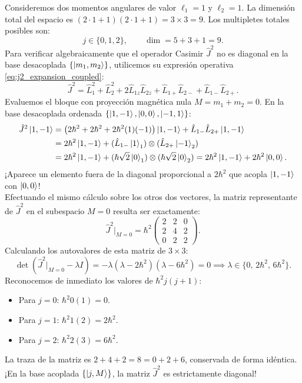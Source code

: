 Consideremos dos momentos angulares de valor $\ell_1 = 1$ y $\ell_2 = 1$. La dimensión total del espacio es $(2\cdot 1 + 1)(2\cdot 1 + 1) = 3 \times 3 = 9$. Los multipletes totales posibles son:
\begin{equation}
    j \in \{0, 1, 2\}, \qquad \dim = 5 + 3 + 1 = 9.
\end{equation}
Para verificar algebraicamente que el operador Casimir $\hat{J}^2$ no es diagonal en la base desacoplada $\{\left| m_1, m_2 \right\rangle\}$, utilicemos su expresión operativa \eqref{eq:j2_expansion_coupled}:
\begin{equation}
    \hat{J}^2 = \hat{L}_1^2 + \hat{L}_2^2 + 2\hat{L}_{1z}\hat{L}_{2z} + \hat{L}_{1+}\hat{L}_{2-} + \hat{L}_{1-}\hat{L}_{2+}.
\end{equation}
Evaluemos el bloque con proyección magnética nula $M = m_1 + m_2 = 0$. En la base desacoplada ordenada $\{\left| 1, -1 \right\rangle, \left| 0, 0 \right\rangle, \left| -1, 1 \right\rangle\}$:
\begin{align}
    \hat{J}^2\left| 1, -1 \right\rangle &= \left(2\hbar^2 + 2\hbar^2 + 2\hbar^2(1)(-1)\right)\left| 1, -1 \right\rangle + \hat{L}_{1-}\hat{L}_{2+}\left| 1, -1 \right\rangle \nonumber\\
    &= 2\hbar^2\left| 1, -1 \right\rangle + (\hat{L}_{1-}\left| 1 \right\rangle_1) \otimes (\hat{L}_{2+}\left| -1 \right\rangle_2) \nonumber\\
    &= 2\hbar^2\left| 1, -1 \right\rangle + (\hbar\sqrt{2}\left| 0 \right\rangle_1) \otimes (\hbar\sqrt{2}\left| 0 \right\rangle_2) = 2\hbar^2\left| 1, -1 \right\rangle + 2\hbar^2\left| 0, 0 \right\rangle.
\end{align}
¡Aparece un elemento fuera de la diagonal proporcional a $2\hbar^2$ que acopla $\left| 1, -1 \right\rangle$ con $\left| 0, 0 \right\rangle$!\\
Efectuando el mismo cálculo sobre los otros dos vectores, la matriz representante de $\hat{J}^2$ en el subespacio $M = 0$ resulta ser exactamente:
\begin{equation}
    \hat{J}^2|_{M=0} = \hbar^2 \begin{pmatrix} 2 & 2 & 0 \\ 2 & 4 & 2 \\ 0 & 2 & 2 \end{pmatrix}.
    \label{eq:matrix_j2_block_zero}
\end{equation}
Calculando los autovalores de esta matriz de $3\times 3$:
\begin{equation}
    \det\left( \hat{J}^2|_{M=0} - \lambda I \right) = -\lambda(\lambda - 2\hbar^2)(\lambda - 6\hbar^2) = 0 \implies \lambda \in \{0, \, 2\hbar^2, \, 6\hbar^2\}.
\end{equation}
Reconocemos de inmediato los valores de $\hbar^2 j(j+1)$:
\begin{itemize}
    \item Para $j = 0$: $\hbar^2 0(1) = 0$.
    \item Para $j = 1$: $\hbar^2 1(2) = 2\hbar^2$.
    \item Para $j = 2$: $\hbar^2 2(3) = 6\hbar^2$.
\end{itemize}
La traza de la matriz es $2 + 4 + 2 = 8 = 0 + 2 + 6$, conservada de forma idéntica. ¡En la base acoplada $\{\left| j, M \right\rangle\}$, la matriz $\hat{J}^2$ es estrictamente diagonal!


